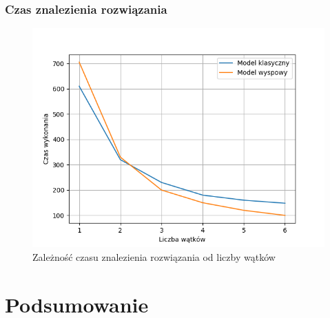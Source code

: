 \documentclass{beamer}
\begin{document}
\begin{frame}
\frametitle{Czas znalezienia rozwiązania}
\begin{figure}[ht]
    \centering
    \includegraphics[scale=0.5]{time_threads_compare.png}
    \caption{Zależność czasu znalezienia rozwiązania od liczby wątków}
\end{figure}    
\end{frame}

\section{Podsumowanie}

% 
% 
\end{document}
